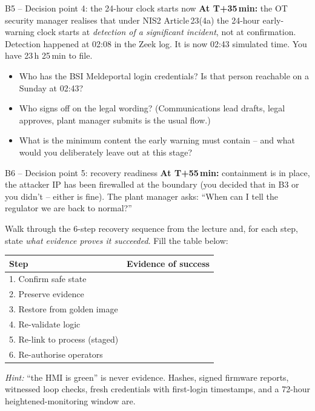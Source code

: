 \documentclass[11pt,a4paper]{article}
\begin{document}
\begin{stepbox}{B5 -- Decision point 4: the 24-hour clock starts now}
\textbf{At T+35\,min:} the OT security manager realises that under NIS2 Article\,23(4a) the 24-hour early-warning clock starts at \emph{detection of a significant incident}, not at confirmation. Detection happened at 02:08 in the Zeek log. It is now 02:43 simulated time. You have 23\,h 25\,min to file.

\begin{itemize}\setlength{\itemsep}{1pt}
  \item Who has the BSI Meldeportal login credentials? Is that person reachable on a Sunday at 02:43?
  \item Who signs off on the legal wording? (Communications lead drafts, legal approves, plant manager submits is the usual flow.)
  \item What is the minimum content the early warning must contain -- and what would you deliberately leave out at this stage?
\end{itemize}
\end{stepbox}

\begin{stepbox}{B6 -- Decision point 5: recovery readiness}
\textbf{At T+55\,min:} containment is in place, the attacker IP has been firewalled at the boundary (you decided that in B3 or you didn't -- either is fine). The plant manager asks: ``When can I tell the regulator we are back to normal?''

Walk through the 6-step recovery sequence from the lecture and, for each step, state \emph{what evidence proves it succeeded}. Fill the table below:

\vspace{1mm}
\begin{tabular}{p{5cm}p{9cm}}
\toprule
\textbf{Step} & \textbf{Evidence of success} \\
\midrule
1. Confirm safe state           & \\
2. Preserve evidence            & \\
3. Restore from golden image    & \\
4. Re-validate logic            & \\
5. Re-link to process (staged)  & \\
6. Re-authorise operators       & \\
\bottomrule
\end{tabular}

\vspace{1mm}
\emph{Hint:} ``the HMI is green'' is never evidence. Hashes, signed firmware reports, witnessed loop checks, fresh credentials with first-login timestamps, and a 72-hour heightened-monitoring window are.
\end{stepbox}
\end{document}
